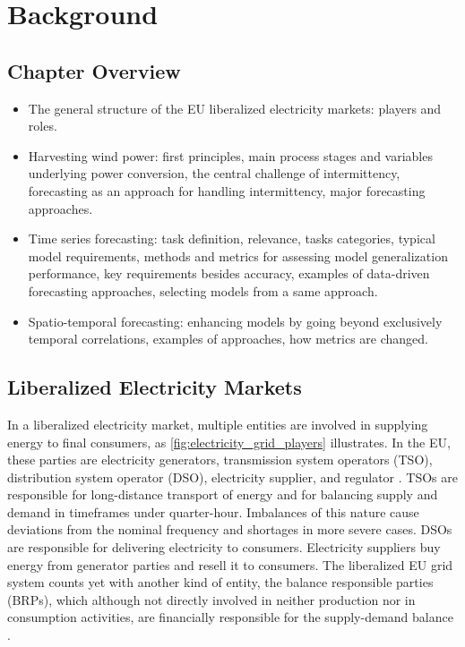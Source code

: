 \graphicspath{{./figures/background/}}

\chapter{Background}

\section*{Chapter Overview}
\begin{itemize}
    \item The general structure of the EU liberalized electricity markets: players and roles.
    \item Harvesting wind power: first principles, main process stages and variables underlying power conversion, the central challenge of intermittency, forecasting as an approach for handling intermittency, major forecasting approaches.
    \item Time series forecasting: task definition, relevance, tasks categories, typical model requirements, methods and metrics for assessing model generalization performance, key requirements besides accuracy, examples of data-driven forecasting approaches, selecting models from a same approach.
    \item Spatio-temporal forecasting: enhancing models by going beyond exclusively temporal correlations, examples of approaches, how metrics are changed.
\end{itemize}
\pagebreak

\section{Liberalized Electricity Markets}

In a liberalized electricity market, multiple entities are involved in supplying energy to final consumers, as \ref{fig:electricity_grid_players} illustrates.
In the EU, these parties are electricity generators, transmission system operators (TSO), distribution system operator (DSO), electricity supplier, and regulator \cite{erbach2016market}.
TSOs are responsible for long-distance transport of energy and for balancing supply and demand in timeframes under quarter-hour. Imbalances of this nature cause deviations from the nominal frequency and shortages in more severe cases.
DSOs are responsible for delivering electricity to consumers.
Electricity suppliers buy energy from generator parties and resell it to consumers.
The liberalized EU grid system counts yet with another kind of entity, the balance responsible parties (BRPs), which although not directly involved in neither production nor in consumption activities, are financially responsible for the supply-demand balance \cite{erbach2016market}.

